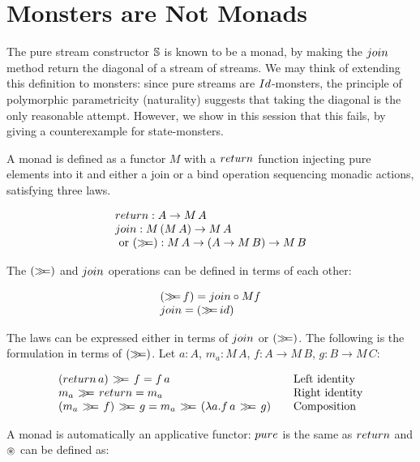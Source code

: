 \section{Monsters are Not Monads}\label{sec:monad}

The pure stream constructor $\mathbb{S}$ is known to be a monad, by making the $\join$ method return the diagonal of a stream of streams.
We may think of extending this definition to monsters: since pure streams are $\Id$-monsters, the principle of polymorphic parametricity (naturality) suggests that taking the diagonal is the only reasonable attempt.
However, we show in this session that this fails, by giving a counterexample for state-monsters.

A monad is defined as a functor $M$ with a $\return$ function injecting pure elements into it and either a join or a bind operation sequencing monadic actions, satisfying three laws.

$$
\begin{array}{l}
\return : A \rightarrow M\, A \\
\join : M\,(M\, A) \rightarrow M\, A\\
\mbox{ or }
(\bind) : M\, A \rightarrow (A \rightarrow M\, B) \rightarrow M\, B
\end{array}
$$

The $(\mathbin{\gg\!\!=})$ and $\join$ operations can be defined in terms of each other:

$$
\begin{array}{l}
(\bind\, f) = \join \comp M f \\
\join = (\bind\,\id)
\end{array}
$$

The laws can be expressed either in terms of $\join$ or $(\mathbin{\gg\!\!=})$.
The following is the formulation in terms of $(\mathbin{\gg\!\!=})$.
Let $a:A$, $m_a : M\, A$,
$f : A \rightarrow M\, B$, $g : B \rightarrow M\,C$:

$$
\begin{array}{l@{\qquad}l}
(\return\, a)\, \bind \, f = f\, a
  & \mbox{Left identity} \\
m_a\, \bind \, \return = m_a
  & \mbox{Right identity} \\
(m_a \, \bind \, f)\, \bind \, g = m_a\, \bind\, (\lambda a.  f\, a \, \bind \, g)
  & \mbox{Composition} \\
\end{array}
$$

A monad is automatically an applicative functor:
$\apure$ is the same as $\return$ and $\circledast$ can be defined as:

